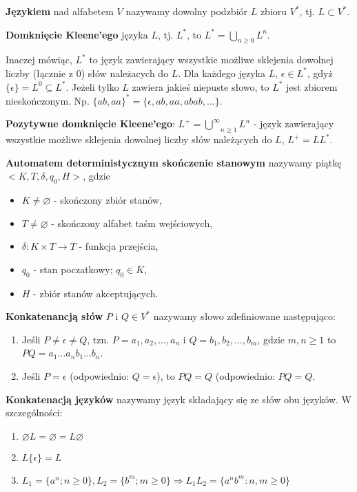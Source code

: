 \documentclass{mwart}
\begin{document}
\textbf{Językiem} nad alfabetem $V$ nazywamy dowolny podzbiór $L$ zbioru $V^{*}$, tj. $L \subset V^{*}$.\medskip

\textbf{Domknięcie Kleene'ego} języka $L$, tj. $L^{*}$, to $L^{*} = \bigcup_{n \ge 0}L^{n}$.\par
Inaczej mówiąc, $L^{*}$ to język zawierający wszystkie możliwe sklejenia dowolnej liczby (łącznie z 0) słów należacych do $L$.  Dla każdego języka $L$, $\epsilon \in L^{*}$, gdyż $\{\epsilon\} = L^{0} \subseteq L^{*}$.  Jeżeli tylko $L$ zawiera jakieś niepuste słowo, to $L^{*}$ jest zbiorem nieskończonym.  Np. $\{ab, aa\}^{*} = \{\epsilon, ab, aa, abab, ...\}$.\medskip

\textbf{Pozytywne domknięcie Kleene'ego}: $L^{+} =\overset{\infty}{\bigcup}_{n \ge 1}L^{n}$ - język zawierający wszystkie możliwe sklejenia dowolnej liczby słów należących do $L$, $L^{+} = LL^{*}$.\medskip

\textbf{Automatem deterministycznym skończenie stanowym} nazywamy piątkę $<K, T, \delta, q_{0}, H>$, gdzie
\begin{itemize}
\item $K \neq \varnothing$ - skończony zbiór stanów,
\item $T \neq \varnothing$ - skończony alfabet taśm wejściowych,
\item $\delta: K \times T \to T$ - funkcja przejścia,
\item $q_{0}$ - stan poczatkowy; $q_{0} \in K$,
\item $H$ - zbiór stanów akceptujących.
\end{itemize}\medskip

\textbf{Konkatenancją słów} $P$ i $Q \in V^{*}$ nazywamy słowo zdefiniowane następująco:
\begin{enumerate}
\item Jeśli $P \neq \epsilon \neq Q$, tzn. $P = a_{1}, a_{2}, ..., a_{n}$ i $Q = b_{1}, b_{2}, ..., b_{m}$, gdzie $m, n \ge 1$ to $PQ = a_{1}...a_{n}b_{1}...b_{n}$.
\item Jeśli $P = \epsilon$ (odpowiednio: $Q = \epsilon$), to $PQ = Q$ (odpowiednio: $PQ = Q$.
\end{enumerate}\medskip

\textbf{Konkatenacją języków} nazywamy język składający się ze słów obu języków. W szczególności:
\begin{enumerate}
\item $\varnothing L = \varnothing = L\varnothing$
\item $L\{\epsilon\} = L$
\item $L_{1} = \{a^{n}; n \ge 0\}, L_{2} = \{b^{m}; m \ge 0\} \Rightarrow L_{1}L_{2} = \{a^{n}b^{m}: n, m \ge 0 \}$
\end{enumerate}\medskip
\end{document}
